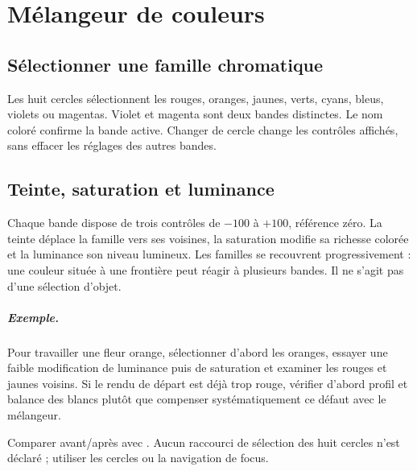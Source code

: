 \chapter{Mélangeur de couleurs}
\section{Sélectionner une famille chromatique}
Les huit cercles sélectionnent les rouges, oranges, jaunes, verts, cyans,
bleus, violets ou magentas. Violet et magenta sont deux bandes distinctes.
Le nom coloré confirme la bande active. Changer de cercle change les
contrôles affichés, sans effacer les réglages des autres bandes.

\section{Teinte, saturation et luminance}
Chaque bande dispose de trois contrôles de $-100$ à $+100$, référence zéro.
La teinte déplace la famille vers ses voisines, la saturation modifie sa
richesse colorée et la luminance son niveau lumineux. Les familles se
recouvrent progressivement : une couleur située à une frontière peut
réagir à plusieurs bandes. Il ne s’agit pas d’une sélection d’objet.

\paragraph{Exemple.}
Pour travailler une fleur orange, sélectionner d’abord les oranges,
essayer une faible modification de luminance puis de saturation et examiner
les rouges et jaunes voisins. Si le rendu de départ est déjà trop rouge,
vérifier d’abord profil et balance des blancs plutôt que compenser systématiquement
ce défaut avec le mélangeur.

Comparer avant/après avec . Aucun raccourci de sélection
des huit cercles n’est déclaré ; utiliser les cercles ou la navigation de focus.
\gestesreglages
